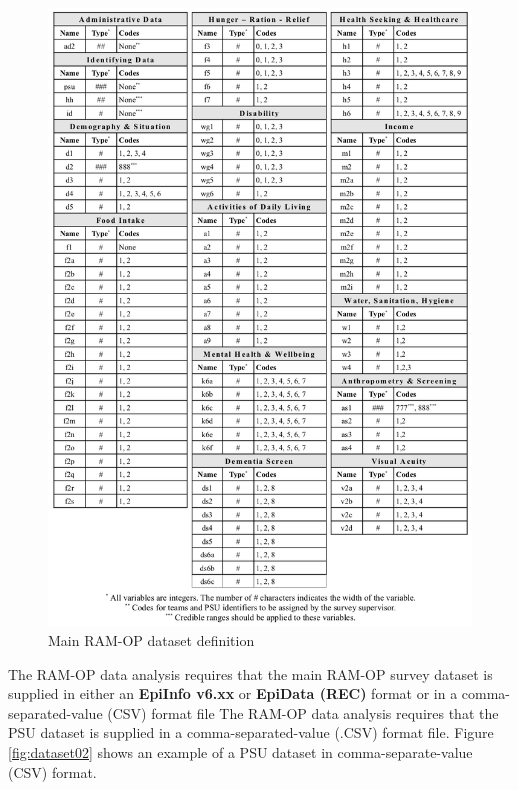 \documentclass[12pt,a4paper]{book}
\theoremstyle{definition}
\theoremstyle{definition}
\theoremstyle{definition}
\theoremstyle{remark}
\begin{document}
\begin{figure}[H]

{\centering \includegraphics[width=14.31in]{figures/dataset01} 

}

\caption{Main RAM-OP dataset definition}\label{fig:dataset01}
\end{figure}

The RAM-OP data analysis requires that the main RAM-OP survey dataset is
supplied in either an \textbf{EpiInfo v6.xx} or \textbf{EpiData (REC)}
format or in a comma-separated-value (CSV) format file The RAM-OP data
analysis requires that the PSU dataset is supplied in a
comma-separated-value (.CSV) format file. Figure \ref{fig:dataset02}
shows an example of a PSU dataset in comma-separate-value (CSV) format.
\end{document}
